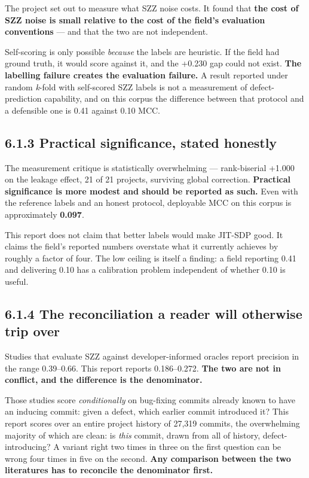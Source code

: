 The project set out to measure what SZZ noise costs. It found that
\textbf{the cost of SZZ noise is small relative to the cost of the
field's evaluation conventions} --- and that the two are not
independent.

Self-scoring is only possible \emph{because} the labels are heuristic.
If the field had ground truth, it would score against it, and the +0.230
gap could not exist. \textbf{The labelling failure creates the
evaluation failure.} A result reported under random \emph{k}-fold with
self-scored SZZ labels is not a measurement of defect-prediction
capability, and on this corpus the difference between that protocol and
a defensible one is 0.41 against 0.10 MCC.

\subsection{6.1.3 Practical significance, stated
honestly}\label{practical-significance-stated-honestly}

The measurement critique is statistically overwhelming --- rank-biserial
+1.000 on the leakage effect, 21 of 21 projects, surviving global
correction. \textbf{Practical significance is more modest and should be
reported as such.} Even with the reference labels and an honest
protocol, deployable MCC on this corpus is approximately \textbf{0.097}.

This report does not claim that better labels would make JIT-SDP good.
It claims the field's reported numbers overstate what it currently
achieves by roughly a factor of four. The low ceiling is itself a
finding: a field reporting 0.41 and delivering 0.10 has a calibration
problem independent of whether 0.10 is useful.

\subsection{6.1.4 The reconciliation a reader will otherwise trip
over}\label{the-reconciliation-a-reader-will-otherwise-trip-over}

Studies that evaluate SZZ against developer-informed oracles report
precision in the range 0.39--0.66. This report reports 0.186--0.272.
\textbf{The two are not in conflict, and the difference is the
denominator.}

Those studies score \emph{conditionally} on bug-fixing commits already
known to have an inducing commit: given a defect, which earlier commit
introduced it? This report scores over an entire project history of
27,319 commits, the overwhelming majority of which are clean: is
\emph{this} commit, drawn from all of history, defect-introducing? A
variant right two times in three on the first question can be wrong four
times in five on the second. \textbf{Any comparison between the two
literatures has to reconcile the denominator first.}

